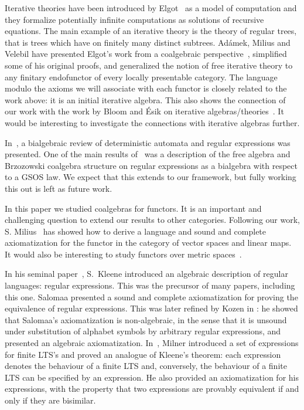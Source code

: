 \documentclass{LMCS}
\theoremstyle{definition}
\theoremstyle{plain}
\theoremstyle{plain}
\theoremstyle{plain}
\theoremstyle{plain}
\theoremstyle{definition}
\theoremstyle{definition}
\begin{document}
Iterative theories have been introduced by Elgot~\cite{elgot} as a model of
computation and they formalize potentially infinite computations as
solutions of recursive equations. The main example of an iterative theory is the theory of
regular trees, that is trees which have on finitely many distinct
subtrees. Ad\'amek, Milius and Velebil have presented Elgot's work
from a coalgebraic perspective~\cite{AMV03,adamekmscs2006}, simplified
some of his original proofs, and generalized the notion of free
iterative theory to any finitary endofunctor of every locally
presentable category. The language modulo the axioms we will associate
with each functor is closely related to the work above: it is an 
initial iterative algebra. This also shows the connection of our work with the
work by Bloom and \'Esik on iterative algebras/theories~\cite{BE93}.
 It would be
interesting to investigate the connections with iterative
algebras further. 

In~\cite{jacobs06}, a bialgebraic review of deterministic automata and
regular expressions was presented. One of the main results of~\cite{jacobs06}
was a description of the free algebra and Brzozowski coalgebra
structure on regular expressions as a bialgebra with respect to a GSOS
law. We expect that this extends to our framework, but fully working this out is left as future
work. 

In this paper we studied coalgebras for  functors. It is
an important and challenging question to extend our results to other
categories. Following our work, S. Milius~\cite{milius:lics10} has 
showed how to derive a language and sound and complete
axiomatization for the functor  in the category
of vector spaces and linear maps. It would also be interesting to study functors
over metric spaces~\cite{TuriR98,BreugelW06}.

In his seminal paper~\cite{kleene}, S.~Kleene introduced an
algebraic description of regular languages: regular expressions. This
was the precursor of many papers, including this one. Salomaa \cite{salomaa} presented a sound and complete axiomatization
for proving the equivalence of regular expressions. This was later
refined by Kozen in \cite{kozen}: he showed that Salomaa's
axiomatization is non-algebraic, in the sense that it is unsound under
substitution of alphabet symbols by arbitrary regular expressions, and
presented an algebraic axiomatization. In~\cite{milner}, Milner
introduced a set of expressions for finite LTS's and proved an
analogue of Kleene's theorem: each expression denotes the behaviour
of a finite LTS and, conversely, the behaviour of a finite LTS can
be specified by an expression. He also provided an axiomatization for his expressions, with the property that two expressions are provably equivalent if and only if they are bisimilar.
\end{document}
